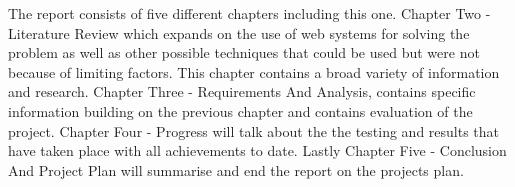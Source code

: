 \documentclass[../main.tex]{subfiles}
\begin{document}
\raggedright
The report consists of five different chapters including this one. Chapter Two - Literature Review which expands on the use of web systems for solving the problem as well as other possible techniques that could be used but were not because of limiting factors. This chapter contains a broad variety of information and research. Chapter Three - Requirements And Analysis, contains specific information building on the previous chapter and contains evaluation of the project. Chapter Four - Progress will talk about the the testing and results that have taken place with all achievements to date. Lastly Chapter Five - Conclusion And Project Plan will summarise and end the report on the projects plan.  
\end{document}
